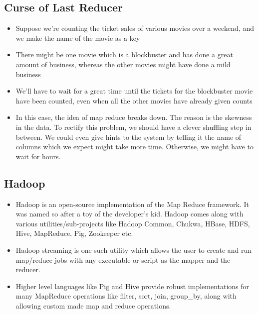 \subsection{Curse of Last Reducer}
\begin{itemize}
    \item Suppose we're counting the ticket sales of various movies over a weekend, and we make the name of the movie as a key
    \item There might be one movie which is a blockbuster and has done a great amount of business, whereas the other movies might have done a mild business
    \item We'll have to wait for a great time until the tickets for the blockbuster movie have been counted, even when all the other movies have already given counts
    \item In this case, the idea of map reduce breaks down. The reason is the skewness in the data. To rectify this problem, we should have a clever shuffling step in between. We could even give hints to the system by telling it the name of columns which we expect might take more time. Otherwise, we might have to wait for hours.
\end{itemize}

\subsection{Hadoop}
\begin{itemize}
    \item Hadoop is an open-source implementation of the Map Reduce framework. It was named so after a toy of the developer's kid.
Hadoop comes along with various utilities/sub-projects like Hadoop Common, Chukwa, HBase, HDFS, Hive, MapReduce, Pig, Zookeeper etc.
    \item Hadoop streaming is one such utility which allows the user to create and run map/reduce jobs with any executable or script as the mapper and the reducer.
    \item Higher level languages like Pig and Hive provide robust implementations for many MapReduce operations like filter, sort, join, group\_by, along with allowing custom made map and reduce operations.
\end{itemize}
